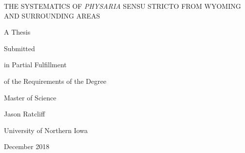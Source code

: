 \clearpage
\thispagestyle{empty}
\begin{center} 
THE SYSTEMATICS OF \textit{PHYSARIA} SENSU STRICTO FROM WYOMING 
AND SURROUNDING AREAS
\end{center}
\vspace*{\fill}
\begin{center}
  A Thesis

  Submitted

  in Partial Fulfillment

  of the Requirements of the Degree
  
  Master of Science
\end{center}
\vspace*{\fill}
\begin{center}
  Jason Ratcliff
  
  University of Northern Iowa
  
  December 2018
\end{center}